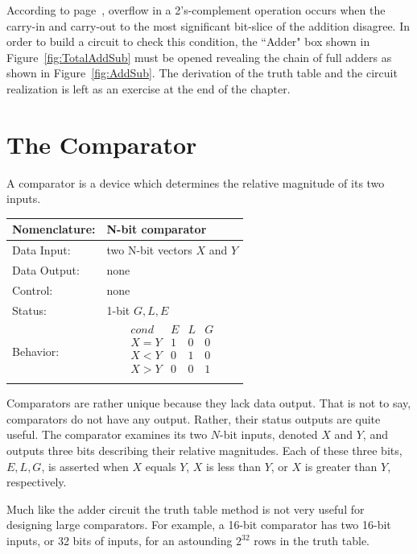 According to page~\pageref{page:Ovf}, overflow in a 2's-complement 
operation occurs when the carry-in and carry-out to the most
significant bit-slice of the addition disagree.  In order to 
build a circuit to check this condition, the ``Adder" box shown in 
Figure~\ref{fig:TotalAddSub} must be opened revealing
the chain of full adders as shown in Figure~\ref{fig:AddSub}.
The derivation of the truth table and the circuit realization
is left as an exercise at the end of the chapter.

\section{The Comparator}
A comparator is a device which determines the relative magnitude
of its two inputs.

\begin{tabular}{|l|p{3.5in}|} \hline
Nomenclature:  & N-bit comparator                \\ \hline
Data Input:    & two N-bit vectors $X$ and $Y$           \\ \hline  
Data Output:   & none               \\ \hline
Control:       & none                      \\ \hline
Status:        & 1-bit $G,L,E$ \\ \hline
Behavior:      & 
		$$\begin{array}{l|l|l|l}
      			cond  & E & L & G \\ \hline
			X = Y & 1 & 0 & 0 \\ \hline
			X < Y & 0 & 1 & 0 \\ \hline
			X > Y & 0 & 0 & 1 \\
		\end{array}$$			\\ \hline
\end{tabular}
\label{page:com}

Comparators are rather unique because they lack data output.  That is
not to say, comparators do not have any output. Rather, their status outputs are quite
useful.  The comparator examines its two $N$-bit inputs, denoted $X$ and
$Y$, and outputs three bits describing their relative magnitudes.  
Each of these three bits, $E,L,G$, is asserted when $X$ equals $Y$, 
$X$ is less than $Y$, or $X$ is greater than $Y$, respectively.  

Much like the adder circuit the truth table method is not very 
useful for designing large comparators.  For example, a 16-bit 
comparator has two 16-bit inputs, or 32 bits of inputs, for an 
astounding $2^{32}$ rows in the truth table.  

